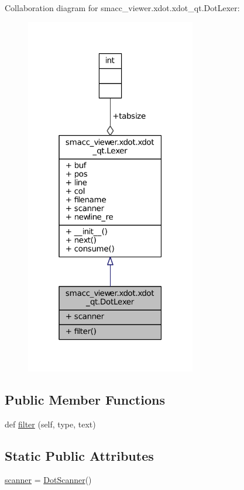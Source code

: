 Collaboration diagram for smacc\+\_\+viewer.\+xdot.\+xdot\+\_\+qt.\+Dot\+Lexer\+:
\nopagebreak
\begin{figure}[H]
\begin{center}
\leavevmode
\includegraphics[width=211pt]{classsmacc__viewer_1_1xdot_1_1xdot__qt_1_1DotLexer__coll__graph}
\end{center}
\end{figure}
\subsection*{Public Member Functions}
\begin{DoxyCompactItemize}
\item 
def \hyperlink{classsmacc__viewer_1_1xdot_1_1xdot__qt_1_1DotLexer_adf9b3add46fdb9d96f457be225abd5b7}{filter} (self, type, text)
\end{DoxyCompactItemize}
\subsection*{Static Public Attributes}
\begin{DoxyCompactItemize}
\item 
\hyperlink{classsmacc__viewer_1_1xdot_1_1xdot__qt_1_1DotLexer_a9f5cee5823d09d8eb8a00e326160b0e4}{scanner} = \hyperlink{classsmacc__viewer_1_1xdot_1_1xdot__qt_1_1DotScanner}{Dot\+Scanner}()
\end{DoxyCompactItemize}
